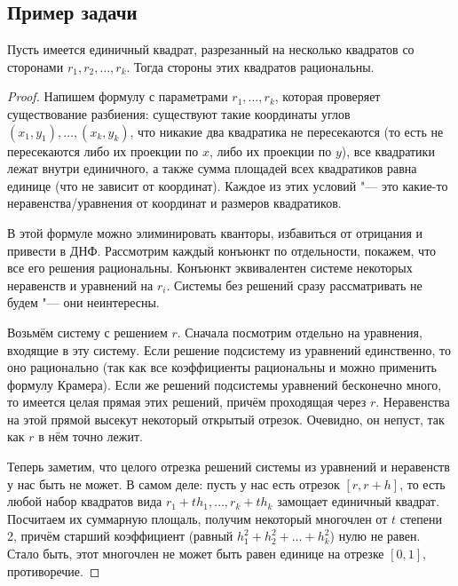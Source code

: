 \subsection{Пример задачи}
\begin{theorem}
	Пусть имеется единичный квадрат, разрезанный на несколько квадратов со сторонами $r_1, r_2, \dots, r_k$.
	Тогда стороны этих квадратов рациональны.
\end{theorem}
\begin{proof}
	Напишем формулу с параметрами $r_1, \dots, r_k$, которая проверяет существование разбиения: существуют такие координаты углов $(x_1, y_1), \dots, (x_k, y_k)$,
	что никакие два квадратика не пересекаются (то есть не пересекаются либо их проекции по $x$, либо их проекции по $y$), все квадратики лежат внутри единичного,
	а также сумма площадей всех квадратиков равна единице (что не зависит от координат).
	Каждое из этих условий "--- это какие-то неравенства/уравнения от координат и размеров квадратиков.

	В этой формуле можно элиминировать кванторы, избавиться от отрицания и привести в ДНФ.
	Рассмотрим каждый конъюнкт по отдельности, покажем, что все его решения рациональны.
	Конъюнкт эквивалентен системе некоторых неравенств и уравнений на $r_i$.
	Системы без решений сразу рассматривать не будем "--- они неинтересны.

	Возьмём систему с решением $r$.
	Сначала посмотрим отдельно на уравнения, входящие в эту систему.
	Если решение подсистему из уравнений единственно, то оно рационально (так как все коэффициенты рациональны и можно применить формулу Крамера).
	Если же решений подсистемы уравнений бесконечно много, то имеется целая прямая этих решений, причём проходящая через $r$.
	Неравенства на этой прямой высекут некоторый открытый отрезок.
	Очевидно, он непуст, так как $r$ в нём точно лежит.

	Теперь заметим, что целого отрезка решений системы из уравнений и неравенств у нас быть не может.
	В самом деле: пусть у нас есть отрезок $[r, r+h]$, то есть любой набор квадратов вида $r_1 + th_1, \dots, r_k + th_k$
	замощает единичный квадрат.
	Посчитаем их суммарную площаль, получим некоторый многочлен от $t$ степени 2, причём старший коэффициент (равный $h_1^2+h_2^2+\dots+h_k^2$) нулю не равен.
	Стало быть, этот многочлен не может быть равен единице на отрезке $[0, 1]$, противоречие.
\end{proof}
